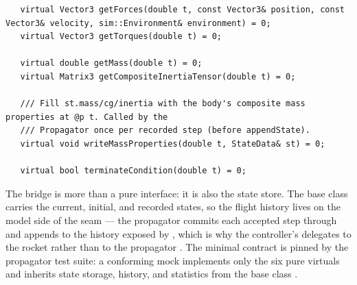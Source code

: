 \begin{listing}[htbp]
\begin{verbatim}
   virtual Vector3 getForces(double t, const Vector3& position, const Vector3& velocity, sim::Environment& environment) = 0;
   virtual Vector3 getTorques(double t) = 0;

   virtual double getMass(double t) = 0;
   virtual Matrix3 getCompositeInertiaTensor(double t) = 0;

   /// Fill st.mass/cg/inertia with the body's composite mass properties at @p t. Called by the
   /// Propagator once per recorded step (before appendState).
   virtual void writeMassProperties(double t, StateData& st) = 0;

   virtual bool terminateCondition(double t) = 0;
\end{verbatim}
\caption{The model$\leftrightarrow$sim bridge, complete .
The integrator needs forces, torques, and time-varying mass properties --- and nothing
else about the rocket.  lets the model, not the loop, decide when
a flight is over.}\label{lst:overview-propagatable}
\end{listing}

The bridge is more than a pure interface: it is also the state store. The base class
carries the current, initial, and recorded states, so the flight history lives on the
model side of the seam --- the propagator commits each accepted step through
  and appends to the history exposed by
 , which is why the controller's
 delegates to the rocket rather than to the propagator
. The minimal contract is pinned by the propagator test suite: a
conforming mock implements only the six pure virtuals and inherits state storage, history,
and statistics from the base class .

